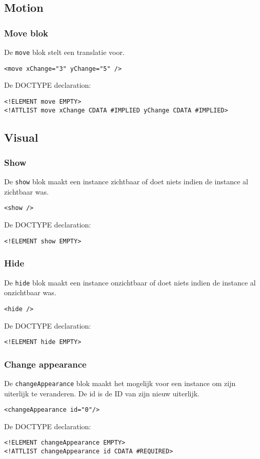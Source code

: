 \documentclass[]{article}
\begin{document}
\subsection{Motion}
\subsubsection{Move blok}
De \texttt{move} blok stelt een translatie voor.	
\lstset{language=XML}
\begin{lstlisting}
<move xChange="3" yChange="5" />
\end{lstlisting}
De DOCTYPE declaration: 
\lstset{language=XML}
\begin{lstlisting}
<!ELEMENT move EMPTY>
<!ATTLIST move xChange CDATA #IMPLIED yChange CDATA #IMPLIED>
\end{lstlisting}

\subsection{Visual}
\subsubsection{Show}
De \texttt{show} blok maakt een instance zichtbaar of doet niets indien de instance al zichtbaar was.
\lstset{language=XML}
\begin{lstlisting}
<show />
\end{lstlisting}
De DOCTYPE declaration: 
\lstset{language=XML}
\begin{lstlisting}
<!ELEMENT show EMPTY>
\end{lstlisting}

\subsubsection{Hide}
De \texttt{hide} blok maakt een instance onzichtbaar of doet niets indien de instance al onzichtbaar was.
\lstset{language=XML}
\begin{lstlisting}
<hide />
\end{lstlisting}
De DOCTYPE declaration: 
\lstset{language=XML}
\begin{lstlisting}
<!ELEMENT hide EMPTY>
\end{lstlisting}

\subsubsection{Change appearance}
De \texttt{changeAppearance} blok maakt het mogelijk voor een instance om zijn uiterlijk te veranderen. De id is de ID van zijn nieuw uiterlijk.
\lstset{language=XML}
\begin{lstlisting}
<changeAppearance id="0"/>
\end{lstlisting}
De DOCTYPE declaration: 
\lstset{language=XML}
\begin{lstlisting}
<!ELEMENT changeAppearance EMPTY>
<!ATTLIST changeAppearance id CDATA #REQUIRED>
\end{lstlisting}
\end{document}

